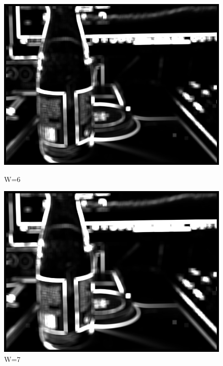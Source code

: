 \documentclass[11pt]{jarticle}
\begin{document}
\begin{figure}[t]
    \begin{minipage}{0.5\hsize}
        \centering
        \includegraphics[scale=.3]{w6.jpg}
        \caption{W=6}
    \end{minipage}
    \begin{minipage}{0.5\hsize}
        \centering
        \includegraphics[scale=.3]{w7.jpg}
        \caption{W=7}
    \end{minipage}
\end{figure}
\end{document}
